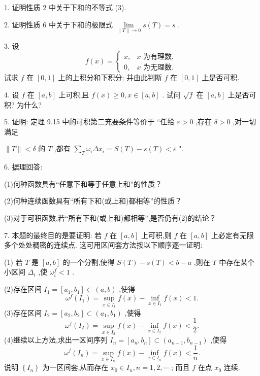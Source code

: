 1. 证明性质 2 中关于下和的不等式 (3).

2. 证明性质 6 中关于下和的极限式 \(\mathop{\lim }\limits_{{\parallel T\parallel  \rightarrow  0}}s\left( T\right)  = s\) .

3. 设
\[
f\left( x\right)  = \left\{  \begin{array}{ll} x, & x\text{ 为有理数, } \\  0, & x\text{ 为无理数. } \end{array}\right.
\]
试求 \(f\) 在 \(\left\lbrack  {0,1}\right\rbrack\) 上的上积分和下积分; 并由此判断 \(f\) 在 \(\left\lbrack  {0,1}\right\rbrack\) 上是否可积.

4. 设 \(f\) 在 \(\left\lbrack  {a,b}\right\rbrack\) 上可积,且 \(f\left( x\right)  \geq  0,x \in  \left\lbrack  {a,b}\right\rbrack\) . 试问 \(\sqrt{f}\) 在 \(\left\lbrack  {a,b}\right\rbrack\) 上是否可积? 为什么?

5. 证明: 定理 9.15 中的可积第二充要条件等价于 “任给 \(\varepsilon  > 0\) ,存在 \(\delta  > 0\) ,对一切满足

\(\parallel T\parallel  < \delta\) 的 \(T\) ,都有 \(\mathop{\sum }\limits_{T}{\omega }_{i}\Delta {x}_{i} = S\left( T\right)  - s\left( T\right)  < \varepsilon\) ".

6. 据理回答:

(1)何种函数具有“任意下和等于任意上和”的性质？

(2)何种连续函数具有“所有下和(或上和)都相等”的性质？

(3)对于可积函数,若“所有下和(或上和)都相等”,是否仍有(2)的结论？

7. 本题的最终目的是要证明: 若 \(f\) 在 \(\left\lbrack  {a,b}\right\rbrack\) 上可积,则 \(f\) 在 \(\left\lbrack  {a,b}\right\rbrack\) 上必定有无限多个处处稠密的连续点. 这可用区间套方法按以下顺序逐一证明:

(1) 若 \(T\) 是 \(\left\lbrack  {a,b}\right\rbrack\) 的一个分割,使得 \(S\left( T\right)  - s\left( T\right)  < b - a\) ,则在 \(T\) 中存在某个小区间 \({\Delta }_{i}\) ,使 \({\omega }_{i}^{f} < 1\) .

(2)存在区间 \({I}_{1} = \left\lbrack  {{a}_{1},{b}_{1}}\right\rbrack   \subset  \left( {a,b}\right)\) ,使得
\[
{\omega }^{f}\left( {I}_{1}\right)  = \mathop{\sup }\limits_{{x \in  {I}_{1}}}f\left( x\right)  - \mathop{\inf }\limits_{{x \in  {I}_{1}}}f\left( x\right)  < 1.
\]
(3)存在区间 \({I}_{2} = \left\lbrack  {{a}_{2},{b}_{2}}\right\rbrack   \subset  \left( {{a}_{1},{b}_{1}}\right)\) ,使得
\[
{\omega }^{f}\left( {I}_{2}\right)  = \mathop{\sup }\limits_{{x \in  {I}_{2}}}f\left( x\right)  - \mathop{\inf }\limits_{{x \in  {I}_{2}}}f\left( x\right)  < \frac{1}{2}.
\]
(4)继续以上方法,求出一区间序列 \({I}_{n} = \left\lbrack  {{a}_{n},{b}_{n}}\right\rbrack   \subset  \left( {{a}_{n - 1},{b}_{n - 1}}\right)\) ,使得
\[
{\omega }^{f}\left( {I}_{n}\right)  = \mathop{\sup }\limits_{{x \in  {I}_{n}}}f\left( x\right)  - \mathop{\inf }\limits_{{x \in  {I}_{n}}}f\left( x\right)  < \frac{1}{n}.
\]
说明 \(\left\{  {I}_{n}\right\}\) 为一区间套,从而存在 \({x}_{0} \in  {I}_{n},n = 1,2,\cdots\) ; 而且 \(f\) 在点 \({x}_{0}\) 连续.

